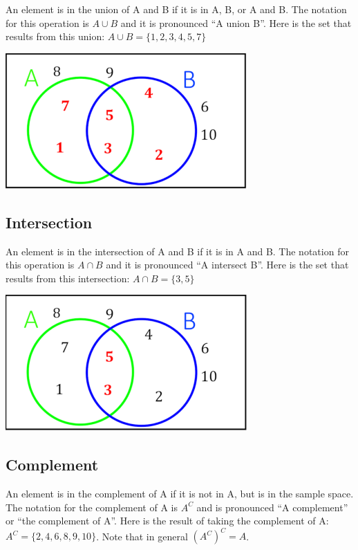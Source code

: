 \documentclass[
]{book}
\begin{document}
An element is in the union of A and B if it is in A, B, or A and B. The notation for this operation is \(A \cup B\) and it is pronounced ``A union B''. Here is the set that results from this union: \(A \cup B = \{1,2,3,4,5,7\}\)

\includegraphics{Pictures/01-Sets/AUB.PNG}

\hypertarget{intersection}{%
\subsection{Intersection}\label{intersection}}

An element is in the intersection of A and B if it is in A and B. The notation for this operation is \(A \cap B\) and it is pronounced ``A intersect B''. Here is the set that results from this intersection: \(A \cap B = \{3,5\}\)

\includegraphics{Pictures/01-Sets/AcapB.PNG}

\hypertarget{complement}{%
\subsection{Complement}\label{complement}}

An element is in the complement of A if it is not in A, but is in the sample space. The notation for the complement of A is \(A^C\) and is pronounced ``A complement'' or ``the complement of A''. Here is the result of taking the complement of A: \(A^C = \{2,4,6,8,9,10\}\). Note that in general \((A^C)^C = A\).
\end{document}
